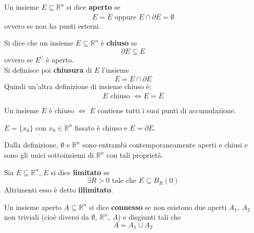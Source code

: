 \begin{definition}
    Un insieme $E \subseteq \mathbb{R}^n$ si dice \textbf{aperto} se
    \begin{equation}
        E=\mathring{E} \text{ oppure } E \cap \partial{E} = \emptyset
    \end{equation}
    ovvero se non ha punti esterni.
\end{definition}
\begin{definition}
    Si dice che un insieme $E \subseteq \mathbb{R}^n$ è \textbf{chiuso} se 
    \begin{equation}
        \partial{E} \subseteq E
    \end{equation}
    ovvero se $E^\complement$ è aperto.\\
    Si definisce poi \textbf{chiusura} di $E$ l'insieme
    \begin{equation}
        \overline{E} = E \cap \partial{E}
    \end{equation}
    Quindi un'altra definizione di insieme chiuso è:
    \begin{equation}
        E \text{ chiuso } \iff E=\overline{E}
    \end{equation}
\end{definition}
\begin{proposition}
    Un insieme $E$ è chiuso $\iff$ $E$ contiene tutti i suoi punti di accumulazione.
\end{proposition}
\begin{oss}
    $E=\{x_0\}$ con $x_0 \in \mathbb{R}^n$ fissato è chiuso e $E=\partial{E}$.
\end{oss}
\begin{oss}
    Dalla definizione, $\emptyset$ e $\mathbb{R}^n$ sono entrambi contemporaneamente aperti e chiusi e sono gli unici sottoinsiemi di $\mathbb{R}^n$ con tali proprietà.
\end{oss}
\begin{definition}
    Sia $E \subseteq \mathbb{R}^n$, $E$ si dice \textbf{limitato} se
    \begin{equation}
        \exists R>0 \text{ tale che } E \subseteq B_R(0)
    \end{equation}
    Altrimenti esso è detto \textbf{illimitato}.
\end{definition}
\begin{definition}
    Un insieme aperto $A\subseteq \mathbb{R}^n$ si dice \textbf{connesso} se non esistono due aperti $A_1, \ A_2$ non triviali (cioè diversi da $\emptyset,\ \mathbb{R}^n,\ A$) e disgiunti tali che
    \begin{equation}
        A=A_1 \cup A_2
    \end{equation}
\end{definition}
